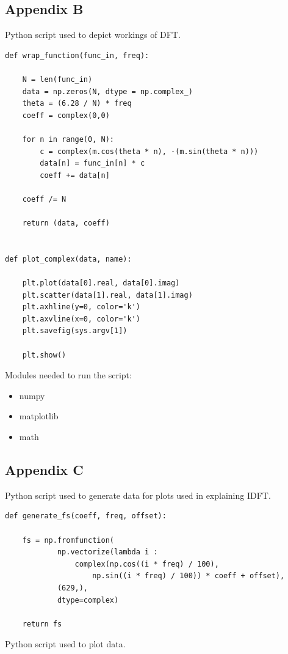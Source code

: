 \documentclass[titlepage]{article}
\begin{document}
\subsection{Appendix B}

    Python script used to depict workings of DFT.

    \begin{verbatim}
def wrap_function(func_in, freq):

    N = len(func_in)
    data = np.zeros(N, dtype = np.complex_)
    theta = (6.28 / N) * freq
    coeff = complex(0,0)

    for n in range(0, N):
        c = complex(m.cos(theta * n), -(m.sin(theta * n)))
        data[n] = func_in[n] * c
        coeff += data[n]

    coeff /= N

    return (data, coeff)


def plot_complex(data, name):

    plt.plot(data[0].real, data[0].imag)
    plt.scatter(data[1].real, data[1].imag)
    plt.axhline(y=0, color='k')
    plt.axvline(x=0, color='k')
    plt.savefig(sys.argv[1])

    plt.show()
    \end{verbatim}

    Modules needed to run the script:
    \begin{itemize}
        \item numpy
        \item matplotlib
        \item math
    \end{itemize}

\subsection{Appendix C}

    Python script used to generate data for plots used in explaining IDFT.

    \begin{verbatim}
def generate_fs(coeff, freq, offset):
    
    fs = np.fromfunction(
            np.vectorize(lambda i : 
                complex(np.cos((i * freq) / 100), 
                    np.sin((i * freq) / 100)) * coeff + offset),
            (629,), 
            dtype=complex)

    return fs
    \end{verbatim}

    Python script used to plot data.
\end{document}
